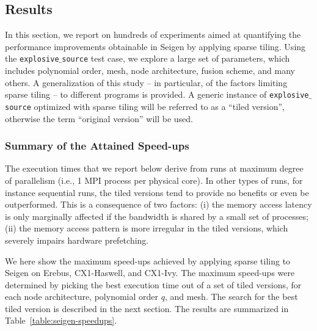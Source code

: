 \subsection{Results}
\label{sec:tiling:seigen-results}
In this section, we report on hundreds of experiments aimed at quantifying the performance improvements obtainable in Seigen by applying sparse tiling. Using the {\tt explosive$\_$source} test case, we explore a large set of parameters, which includes polynomial order, mesh, node architecture, fusion scheme, and many others. A generalization of this study -- in particular, of the factors limiting sparse tiling -- to different programs is provided. A generic instance of {\tt explosive$\_$source} optimized with sparse tiling will be referred to as a ``tiled version'', otherwise the term ``original version'' will be used.

\subsubsection{Summary of the Attained Speed-ups}
The execution times that we report below derive from runs at maximum degree of parallelism (i.e., 1 MPI process per physical core). In other types of runs, for instance sequential runs, the tiled versions tend to provide no benefits or even be outperformed. This is a consequence of two factors: (i) the memory access latency is only marginally affected if the bandwidth is shared by a small set of processes; (ii) the memory access pattern is more irregular in the tiled versions, which severely impairs hardware prefetching. 

We here show the maximum speed-ups achieved by applying sparse tiling to Seigen on Erebus, CX1-Haswell, and CX1-Ivy. The maximum speed-ups were determined by picking the best execution time out of a set of tiled versions, for each node architecture, polynomial order $q$, and mesh. The search for the best tiled version is described in the next section. The results are summarized in Table~\ref{table:seigen-speedups}.

